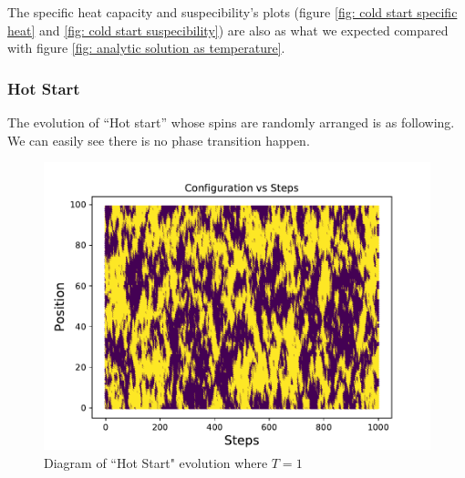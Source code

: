 \documentclass[12pt]{article}
\begin{document}
	The specific heat capacity and suspecibility's plots (figure \ref{fig: cold start specific heat} and \ref{fig: cold start suspecibility}) are also as what we expected compared with figure \ref{fig: analytic solution as temperature}.
	
	\subsubsection{Hot Start}
	\label{sec: ferromagnet hot start}
	The evolution of ``Hot start'' whose spins are randomly arranged is as following. We can easily see there is no phase transition happen. 
	\begin{figure}[H]
		\centering
		\includegraphics{configuration(J=1,N=100,High,T=1).pdf}
		\caption{Diagram of ``Hot Start" evolution where $T=1$}
		\label{fig: high start ferromagnet evolution}
	\end{figure}
	
\end{document}
